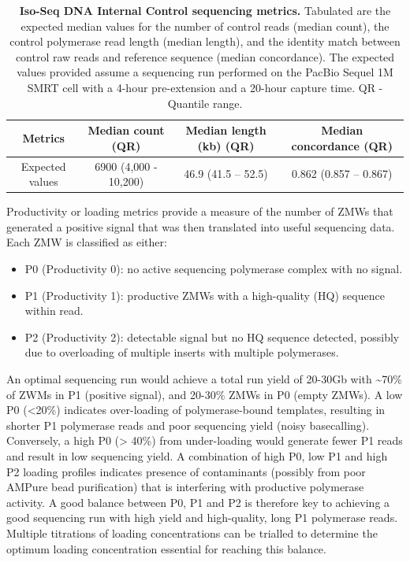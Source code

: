 \vspace{1cm}
\begin{table}[!h]
    \setlength\tabcolsep{4pt} %
	\caption[Iso-Seq DNA Internal Control sequencing metrics]%
	{\textbf{Iso-Seq DNA Internal Control sequencing metrics.} Tabulated are the expected median values for the number of control reads (median count), the control polymerase read length (median length), and the identity match between control raw reads and reference sequence (median concordance). The expected values provided assume a sequencing run performed on the PacBio Sequel 1M SMRT cell with a 4-hour pre-extension and a 20-hour capture time. QR - Quantile range.}	\label{tab:control_Isoseqmetrics}
	
	\centering
	\begin{tabular}{@{}cccc@{}}
		\toprule
		Metrics         & Median count (QR)     & Median length (kb) (QR) & Median concordance (QR) \\ \midrule
		Expected values & 6900 (4,000 - 10,200) & 46.9 (41.5 – 52.5) & 0.862 (0.857 – 0.867)   \\ \bottomrule
	\end{tabular}
\end{table}


Productivity or loading metrics provide a measure of the number of ZMWs that generated a positive signal that was then translated into useful sequencing data. Each ZMW is classified as either: 
\begin{itemize}
	\item P0 (Productivity 0): no active sequencing polymerase complex with no signal. 
	\item P1 (Productivity 1): productive ZMWs with a high-quality (HQ) sequence within read.
	\item P2 (Productivity 2): detectable signal but no HQ sequence detected, possibly due to overloading of multiple inserts with multiple polymerases.
\end{itemize}

An optimal sequencing run would achieve a total run yield of 20-30Gb with \textasciitilde70\% of ZWMs in P1 (positive signal), and 20-30\% ZMWs in P0 (empty ZMWs). A low P0 (<20\%) indicates over-loading of polymerase-bound templates, resulting in shorter P1 polymerase reads and poor sequencing yield (noisy basecalling). Conversely, a high P0 (> 40\%) from under-loading would generate fewer P1 reads and result in low sequencing yield. A combination of high P0, low P1 and high P2 loading profiles indicates presence of contaminants (possibly from poor AMPure bead purification) that is interfering with productive polymerase activity. A good balance between P0, P1 and P2 is therefore key to achieving a good sequencing run with high yield and high-quality, long P1 polymerase reads. Multiple titrations of loading concentrations can be trialled to determine the optimum loading concentration essential for reaching this balance. 

